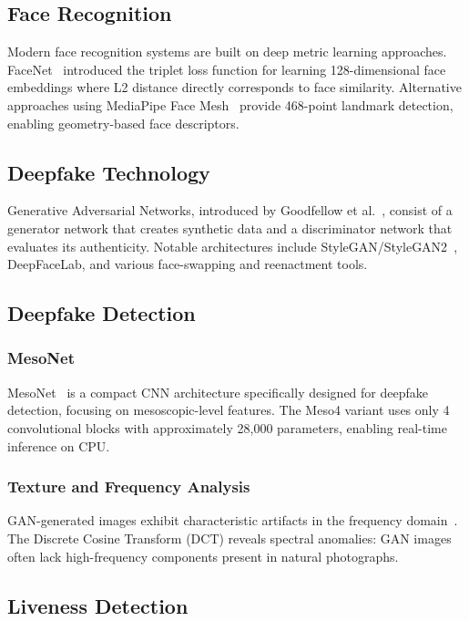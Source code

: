 \documentclass[conference,10pt]{IEEEtran}
\begin{document}
\subsection{Face Recognition}

Modern face recognition systems are built on deep metric learning approaches. FaceNet~\cite{schroff2015} introduced the triplet loss function for learning 128-dimensional face embeddings where L2 distance directly corresponds to face similarity. Alternative approaches using MediaPipe Face Mesh~\cite{kartynnik2019} provide 468-point landmark detection, enabling geometry-based face descriptors.

\subsection{Deepfake Technology}

Generative Adversarial Networks, introduced by Goodfellow et al.~\cite{goodfellow2014}, consist of a generator network that creates synthetic data and a discriminator network that evaluates its authenticity. Notable architectures include StyleGAN/StyleGAN2~\cite{karras2019}, DeepFaceLab, and various face-swapping and reenactment tools.

\subsection{Deepfake Detection}

\subsubsection{MesoNet}

MesoNet~\cite{afchar2018} is a compact CNN architecture specifically designed for deepfake detection, focusing on mesoscopic-level features. The Meso4 variant uses only 4 convolutional blocks with approximately 28,000 parameters, enabling real-time inference on CPU.

\subsubsection{Texture and Frequency Analysis}

GAN-generated images exhibit characteristic artifacts in the frequency domain~\cite{durall2020}. The Discrete Cosine Transform (DCT) reveals spectral anomalies: GAN images often lack high-frequency components present in natural photographs.

\subsection{Liveness Detection}
\end{document}
